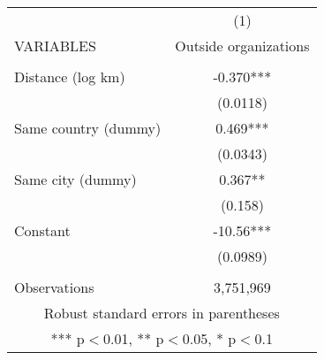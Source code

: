 \begin{tabular}{lc} \hline
 & (1) \\
VARIABLES & Outside organizations \\ \hline
 &  \\
Distance (log km) & -0.370*** \\
 & (0.0118) \\
Same country (dummy) & 0.469*** \\
 & (0.0343) \\
Same city (dummy) & 0.367** \\
 & (0.158) \\
Constant & -10.56*** \\
 & (0.0989) \\
 &  \\
 Observations & 3,751,969 \\ \hline
\multicolumn{2}{c}{ Robust standard errors in parentheses} \\
\multicolumn{2}{c}{ *** p$<$0.01, ** p$<$0.05, * p$<$0.1} \\
\end{tabular}
